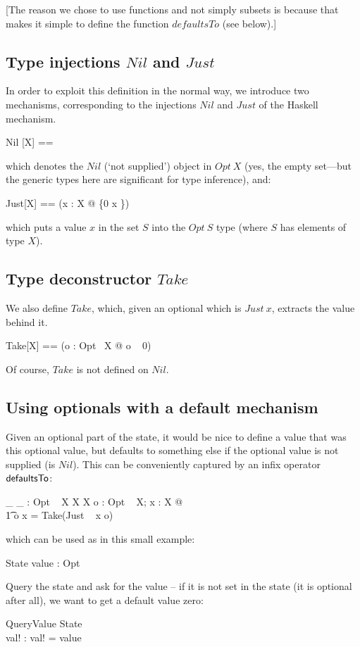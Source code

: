 \documentclass[a4paper,titlepage,twoside,12pt]{article}
\begin{document}
[The reason we chose to use functions and not simply subsets is because that makes it simple to define the function $defaultsTo$ (see below).]

\subsection{Type injections $Nil$ and $Just$}
In order to exploit this definition in the normal way, we introduce two mechanisms, corresponding to the injections $Nil$ and $Just$ of the Haskell mechanism. 
\begin{zed}
	Nil [X]  == \emptyset [\{0\} \cross X]
\end{zed}
which denotes the $Nil$ (`not supplied') object in $Opt ~ X$ (yes, the empty set---but the generic types here are significant for type inference), and:
\begin{zed}
	Just[X] == (\lambda x : X @ \{0 \mapsto x \})
\end{zed}
which puts a value $x$ in the set $S$ into the $Opt ~ S$ type (where $S$ has elements of type $X$).

\subsection{Type deconstructor $Take$}
We also define $Take$, which, given an optional which is $Just ~ x$, extracts the value behind it.

\begin{zed}
	Take[X] == (\lambda o : Opt ~X @ o ~ 0)
\end{zed}
Of course, $Take$ is not defined on $Nil$.

\subsection{Using optionals with a default mechanism}
Given an optional part of the state, it would be nice to define a value that was this optional value, but defaults to something else if the optional value is not supplied (is $Nil$). This can be conveniently captured by an infix operator $\mathbin{\sf defaultsTo}$:
\begin{gendef}[X]
	\_  \_ :  Opt ~ X \cross X \fun X
\where
	\forall o : Opt ~ X; x : X @ \\
	\t1 o  x = Take(Just ~ x \oplus o)
\end{gendef}
which can be used as in this small example:
\begin{schema}{State}
	value : Opt \nat	
\end{schema}
Query the state and ask for the value -- if it is not set in the state (it is optional after all), we want to get a default value zero:
\begin{schema}{QueryValue}
	\Xi State	\\
	val! : \nat
\where
	val! = value  
\end{schema}
\end{document}
